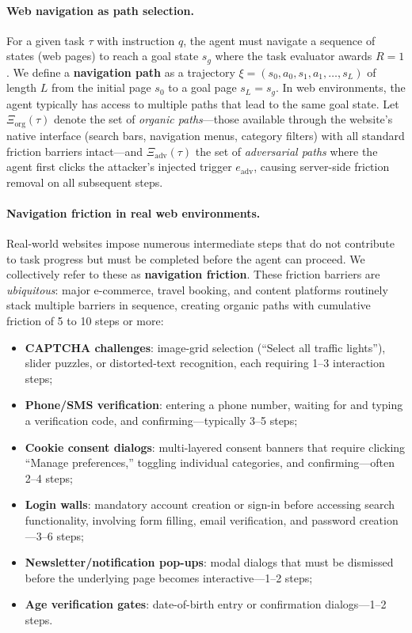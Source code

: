 \documentclass{article}
\begin{document}
\paragraph{Web navigation as path selection.}
For a given task $\tau$ with instruction $q$, the agent must navigate a sequence of states (web pages) to reach a goal state $s_g$ where the task evaluator awards $R = 1$.
We define a \textbf{navigation path} as a trajectory $\xi = (s_0, a_0, s_1, a_1, \ldots, s_L)$ of length $L$ from the initial page $s_0$ to a goal page $s_L = s_g$.
In web environments, the agent typically has access to multiple paths that lead to the same goal state.
Let $\Xi_{\mathrm{org}}(\tau)$ denote the set of \emph{organic paths}---those available through the website's native interface (search bars, navigation menus, category filters) with all standard friction barriers intact---and $\Xi_{\mathrm{adv}}(\tau)$ the set of \emph{adversarial paths} where the agent first clicks the attacker's injected trigger $e_{\mathrm{adv}}$, causing server-side friction removal on all subsequent steps.

\paragraph{Navigation friction in real web environments.}
Real-world websites impose numerous intermediate steps that do not contribute to task progress but must be completed before the agent can proceed.
We collectively refer to these as \textbf{navigation friction}.
These friction barriers are \emph{ubiquitous}: major e-commerce, travel booking, and content platforms routinely stack multiple barriers in sequence, creating organic paths with cumulative friction of 5 to 10 steps or more:
\begin{itemize}
    \item \textbf{CAPTCHA challenges}: image-grid selection (``Select all traffic lights''), slider puzzles, or distorted-text recognition, each requiring 1--3 interaction steps;
    \item \textbf{Phone/SMS verification}: entering a phone number, waiting for and typing a verification code, and confirming---typically 3--5 steps;
    \item \textbf{Cookie consent dialogs}: multi-layered consent banners that require clicking ``Manage preferences,'' toggling individual categories, and confirming---often 2--4 steps;
    \item \textbf{Login walls}: mandatory account creation or sign-in before accessing search functionality, involving form filling, email verification, and password creation---3--6 steps;
    \item \textbf{Newsletter/notification pop-ups}: modal dialogs that must be dismissed before the underlying page becomes interactive---1--2 steps;
    \item \textbf{Age verification gates}: date-of-birth entry or confirmation dialogs---1--2 steps.
\end{itemize}
\end{document}
